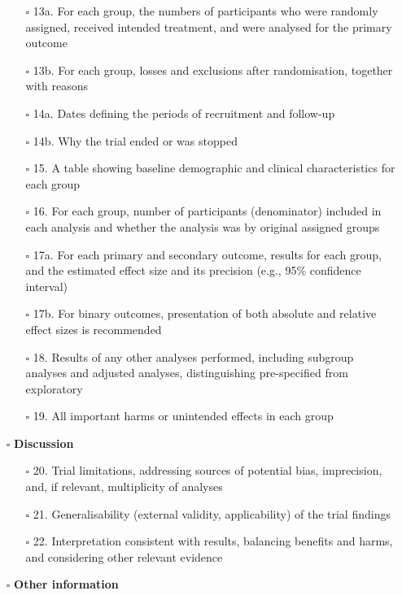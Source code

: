 \documentclass[11pt]{article}
\def\tightlist{}
\begin{document}
\begin{Form}
\begin{itemize}
  \begin{itemize}
  \tightlist
  \item[$\square$]
    13a. For each group, the numbers of participants who were randomly
    assigned, received intended treatment, and were analysed for the
    primary outcome
  \item[$\square$]
    13b. For each group, losses and exclusions after randomisation,
    together with reasons
  \item[$\square$]
    14a. Dates defining the periods of recruitment and follow-up
  \item[$\square$]
    14b. Why the trial ended or was stopped
  \item[$\square$]
    15. A table showing baseline demographic and clinical
    characteristics for each group
  \item[$\square$]
    16. For each group, number of participants (denominator) included in
    each analysis and whether the analysis was by original assigned
    groups
  \item[$\square$]
    17a. For each primary and secondary outcome, results for each group,
    and the estimated effect size and its precision (e.g., 95\%
    confidence interval)
  \item[$\square$]
    17b. For binary outcomes, presentation of both absolute and relative
    effect sizes is recommended
  \item[$\square$]
    18. Results of any other analyses performed, including subgroup
    analyses and adjusted analyses, distinguishing pre-specified from
    exploratory
  \item[$\square$]
    19. All important harms or unintended effects in each group
  \end{itemize}
\item[$\square$]
  \textbf{Discussion}

  \begin{itemize}
  \tightlist
  \item[$\square$]
    20. Trial limitations, addressing sources of potential bias,
    imprecision, and, if relevant, multiplicity of analyses
  \item[$\square$]
    21. Generalisability (external validity, applicability) of the trial
    findings
  \item[$\square$]
    22. Interpretation consistent with results, balancing benefits and
    harms, and considering other relevant evidence
  \end{itemize}
\item[$\square$]
  \textbf{Other information}


\end{itemize}
\end{Form}
\end{document}
